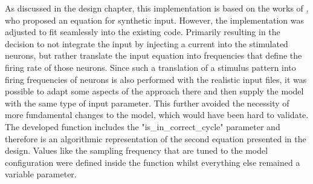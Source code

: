    As discussed in the design chapter, this implementation is based on the works of \textcite{Aussel.2021}, who proposed an equation for synthetic input. However, the implementation was adjusted to fit seamlessly into the existing code. Primarily resulting in the decision to not integrate the input by injecting a current into the stimulated neurons, but rather translate the input equation into frequencies that define the firing rate of those neurons. Since such a translation of a stimulus pattern into firing frequencies of neurons is also performed with the realistic input files, it was possible to adapt some aspects of the approach there and then supply the model with the same type of input parameter. This further avoided the necessity of more fundamental changes to the model, which would have been hard to validate.\\
    The developed function includes the "is\_in\_correct\_cycle" parameter and therefore is an algorithmic representation of the second equation presented in the design. Values like the sampling frequency that are tuned to the model configuration were defined inside the function whilst everything else remained a variable parameter.\\


